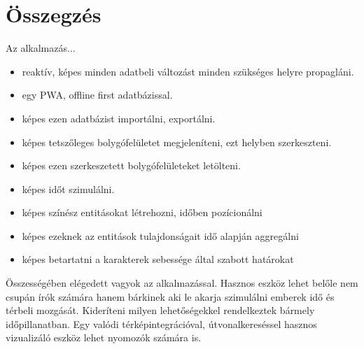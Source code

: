 \chapter{Összegzés}
\label{ch:sum}

Az alkalmazás$\dots$

\begin{itemize}
	\item reaktív, képes minden adatbeli változást minden szükséges helyre propagláni.
	\item egy PWA, offline first adatbázissal.
	\item képes ezen adatbázist importálni, exportálni.
	\item képes tetszőleges bolygófelületet megjeleníteni, ezt helyben szerkeszteni.
	\item képes ezen szerkeszetett bolygófelületeket letölteni.
	\item képes időt szimulálni.
	\item képes színész entitásokat létrehozni, időben pozícionálni
	\item képes ezeknek az entitások tulajdonságait idő alapján aggregálni
	\item képes betartatni a karakterek sebessége által szabott határokat

\end{itemize}

Összességében elégedett vagyok az alkalmazással. Hasznos eszköz lehet belőle nem csupán írók számára hanem bárkinek aki le akarja szimulálni emberek idő és térbeli mozgását. Kideríteni milyen lehetőségekkel rendelkeztek bármely időpillanatban. Egy valódi térképintegrációval, útvonalkereséssel hasznos vizualizáló eszköz lehet nyomozók számára is.
